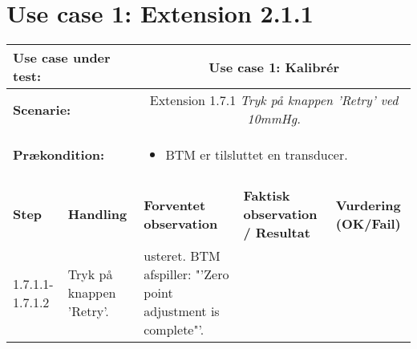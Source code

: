 \section{Use case 1: Extension 2.1.1}
\begin{tabular}{|p{1cm}|p{3cm}|p{4cm}|p{4cm}|p{2cm}|}
\hline
\multicolumn{2}{|p{3cm}|}{\textbf{Use case under test:}} & \multicolumn{3}{c|}{Use case 1: Kalibrér } \\\hline

\multicolumn{2}{|p{3cm}|}{\textbf{Scenarie:}} & \multicolumn{3}{c|}{Extension 1.7.1 \textit{Tryk på knappen 'Retry' ved 10mmHg.}} \\\hline
\multicolumn{2}{|p{3cm}|}{\textbf{Prækondition:}}  & \multicolumn{3}{l|}{\parbox{0.6\textwidth}{
\begin{itemize}[label=$\circ$]
\item BTM er tilsluttet en transducer. 
\end{itemize} }}\\\hline

\multicolumn{5}{|c|}{} \\\hline

\textbf{Step} & \textbf{Handling} & \textbf{Forventet observation} & \textbf{Faktisk observation / Resultat} & \textbf{Vurdering (OK/Fail)}\\\hline

1.7.1.1-1.7.1.2 & Tryk på knappen 'Retry'. & usteret. BTM afspiller: "'Zero point adjustment is complete"'. & & \\\hline

\end{tabular}